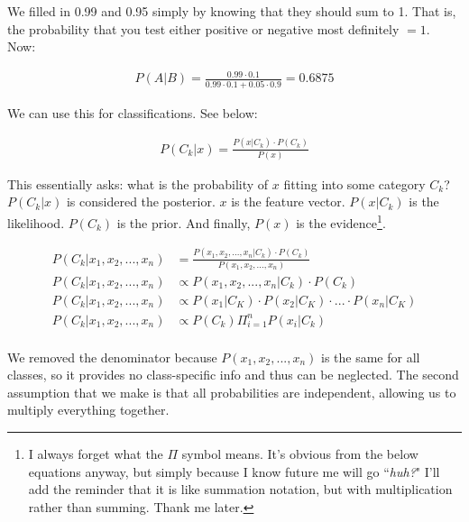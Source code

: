 We filled in 0.99 and 0.95 simply by knowing that they should sum to 1. That is, the probability that you test either positive or negative most definitely $=1$.  Now: 

\begin{equation}
\begin{split}
    P(A | B) = \frac{0.99 \cdot 0.1}{0.99 \cdot 0.1 + 0.05\cdot 0.9} = 0.6875
\end{split}
\end{equation}

We can use this for classifications. See below: 

\begin{equation}
\begin{split}
    P(C_k | x) = \frac{P(x | C_k) \cdot P(C_k)}{P(x)}
\end{split}
\end{equation}

This essentially asks: what is the probability of $x$ fitting into some category $C_k$? $P(C_k | x)$ is considered the posterior. $x$ is the feature vector. $P(x | C_k)$ is the likelihood. $P(C_k)$ is the prior. And finally, $P(x)$ is the evidence\footnote{I always forget what the $\Pi$ symbol means. It's obvious from the below equations anyway, but simply because I know future me will go ``\textit{huh?}" I'll add the reminder that it is like summation notation, but with multiplication rather than summing. Thank me later.}. 

\begin{equation}
\begin{split}
    P(C_k | x_1, x_2, ..., x_n) &= \frac{P(x_1, x_2, ..., x_n | C_k) \cdot P(C_k)}{P(x_1, x_2, ..., x_n)} \\
    P(C_k | x_1, x_2, ..., x_n) &\propto P(x_1, x_2, ..., x_n | C_k) \cdot P(C_k)\\
    P(C_k | x_1, x_2, ..., x_n) &\propto P(x_1 | C_K) \cdot P(x_2 | C_K) \cdot ... \cdot P(x_n | C_K) \\
    P(C_k | x_1, x_2, ..., x_n) &\propto P(C_k)\Pi^n_{i=1}P(x_i|C_k) \\
\end{split}
\end{equation}

We removed the denominator because $P(x_1, x_2, ..., x_n)$ is the same for all classes, so it provides no class-specific info and thus can be neglected. The second assumption that we make is that all probabilities are independent, allowing us to multiply everything together.\newline

